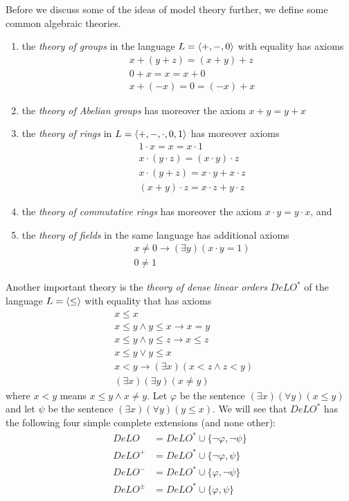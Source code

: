 Before we discuss some of the ideas of model theory further, we define some common algebraic theories. 
\begin{enumerate}
  \item the \emph{theory of groups} in the language $L = \langle +, -, 0 \rangle$ with equality has axioms 
  	\begin{align*}
  		& x + (y + z) = (x + y) + z \\
  		& 0 + x = x = x+0 \\
  		& x + (-x) = 0 = (-x) + x
  	\end{align*}
  \item the \emph{theory of Abelian groups} has moreover the axiom $x + y = y+x$
  \item the \emph{theory of rings} in $L = \langle +, -, \cdot, 0, 1 \rangle$ has moreover axioms 
    \begin{align*}
    	& 1 \cdot x = x = x \cdot 1 \\
    	& x \cdot (y \cdot z) = (x \cdot y) \cdot z \\
    	& x \cdot (y + z) = x \cdot y + x \cdot z \\
    	& (x + y) \cdot z = x\cdot z + y \cdot z
    \end{align*}
  \item the \emph{theory of commutative rings} has moreover the axiom $x \cdot y = y \cdot x$, and
  \item the \emph{theory of fields} in the same language has additional axioms 
    \begin{align*}
    	& x \neq 0 \to (\exists y)(x \cdot y = 1) \\
    	& 0 \neq 1
    \end{align*}
\end{enumerate}

Another important theory is the \emph{theory of dense linear orders} $DeLO^*$ of the language $L = \langle \leq \rangle$ with equality that has axioms
\begin{align*}
& x \leq x \\
& x \leq y \land y \leq x \to x = y \\
& x \leq y \land y \leq z \to x \leq z \\
& x \leq y \lor y \leq x \\
& x < y \to (\exists x)(x < z \land z < y) \\
& (\exists x)(\exists y)(x \neq y)
\end{align*}
where $x < y$ means $x \leq y \land x \neq y$. Let $\varphi$ be the sentence $(\exists x)(\forall y)(x \leq y)$ and let $\psi$ be the sentence $(\exists x)(\forall y)(y \leq x)$. We will see that $DeLO^*$ has the following four simple complete extensions (and none other): 
\begin{align*}
 DeLO &= DeLO^* \cup \{\neg \varphi, \neg \psi\} \\
 DeLO^+ &= DeLO^* \cup \{\neg \varphi, \psi\} \\
 DeLO^- &= DeLO^* \cup \{\varphi, \neg \psi\} \\
 DeLO^\pm &= DeLO^* \cup \{\varphi, \psi\}
\end{align*} 

